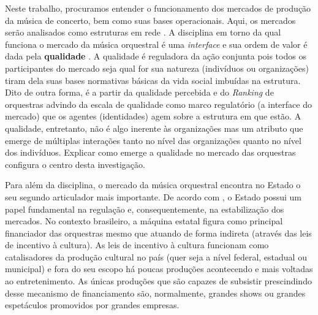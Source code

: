 \documentclass[a4paper, 12pt, openright, oneside, german, french, english, brazil]{abntex2}
\begin{document}
	Neste trabalho, procuramos entender o funcionamento dos mercados de produção da música de concerto, bem como suas bases operacionais. Aqui, os mercados serão analisados como estruturas em rede \cite{white2002markets}. A disciplina em torno da qual funciona o mercado da música orquestral é uma \textit{interface} e sua ordem de valor é dada pela \textbf{qualidade} \cite{white2002markets}. A qualidade é reguladora da ação conjunta pois todos os participantes do mercado seja qual for sua natureza (indivíduos ou organizações) tiram dela suas bases normativas básicas da vida social imbuídas na estrutura. Dito de outra forma, é a partir da qualidade percebida e do \textit{Ranking} de orquestras advindo da escala de qualidade como marco regulatório (a interface do mercado) que os agentes (identidades) agem sobre a estrutura em que estão. A qualidade, entretanto, não é algo inerente às organizações mas um atributo que emerge de múltiplas interações tanto no nível das organizações quanto no nível dos indivíduos. Explicar como emerge a qualidade no mercado das orquestras configura o centro desta investigação.

	Para além da disciplina, o mercado da música orquestral encontra no Estado o seu segundo articulador mais importante.	De acordo com , o Estado possui um papel fundamental na regulação e, consequentemente, na estabilização dos mercados. No contexto brasileiro, a máquina estatal figura como principal financiador das orquestras mesmo que atuando de forma indireta (através das leis de incentivo à cultura). As leis de incentivo à cultura funcionam como catalisadores da produção cultural no país (quer seja a nível federal, estadual ou municipal) e fora do seu escopo há poucas produções acontecendo e mais voltadas ao entretenimento. As únicas produções que são capazes de subsistir prescindindo desse mecanismo de financiamento são, normalmente, grandes shows ou grandes espetáculos promovidos por grandes empresas.
\end{document}
